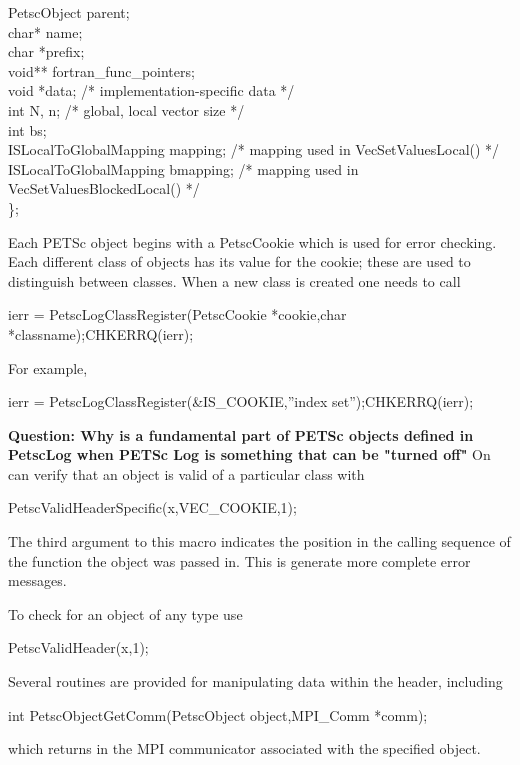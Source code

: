 \documentclass[twoside,12pt]{../sty/report_petsc}
\begin{document}
\begin{tabbing}
  PetscObject            parent;                                  \\
  char*                  name;                                    \\
  char                   *prefix;                                 \\
  void**                 fortran\_func\_pointers;       \\
  void                   *data;     /* implementation-specific data */\\
  int                    N, n;      /* global, local vector size */\\
  int                    bs;\\
  ISLocalToGlobalMapping mapping;   /* mapping used in VecSetValuesLocal() */\\
  ISLocalToGlobalMapping bmapping;  /* mapping used in VecSetValuesBlockedLocal() */\\
\};
\end{tabbing}

Each PETSc object begins with a PetscCookie which is used for error checking.
Each different class of objects has its value for the cookie; these are used
to distinguish between classes. When a new class is created one needs to call
\begin{tabbing}
  ierr = PetscLogClassRegister(PetscCookie *cookie,char *classname);CHKERRQ(ierr);
\end{tabbing}
For example,
\begin{tabbing}
  ierr = PetscLogClassRegister(\&IS\_COOKIE,''index set'');CHKERRQ(ierr);
\end{tabbing}
{\bf Question: Why is a fundamental part of PETSc objects defined in PetscLog when PETSc Log
is something that can be "turned off"} On can verify that an object is valid of a particular
class with 
\begin{tabbing}
  PetscValidHeaderSpecific(x,VEC\_COOKIE,1);
\end{tabbing}
The third argument to this macro indicates the position in the calling sequence of the 
function the object was passed in. This is generate more complete error messages.

To check for an object of any type use
\begin{tabbing}
  PetscValidHeader(x,1);
\end{tabbing}


Several routines are provided for manipulating data within the header,
including
\begin{tabbing}
   int PetscObjectGetComm(PetscObject object,MPI\_Comm *comm);
\end{tabbing}
which returns in   the MPI communicator associated with the
specified object.
\end{document}

